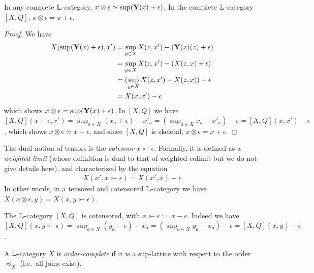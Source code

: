 \begin{lemma}
In any complete $\mathbb{L}$-category, $x\otimes \epsilon \simeq \sup(  \mathbf{Y}(x)+\epsilon  )$.
In the complete $\mathbb{L}$-category $[X,Q]$, $x\otimes \epsilon= x+\epsilon$.
\end{lemma}
\begin{proof}
We have 
\begin{align*}
X(\sup(\mathbf{Y}(x)+\epsilon), x')& =\sup_{y\in X}X(z,x')- (\mathbf{Y}(x)(z)+\epsilon)\\
&= \sup_{y\in X}X(z,x')-(X(z,x)+\epsilon)\\
&= (\sup_{y\in X}X(z,x')-X(z,x))-\epsilon\\
&= X(x,x')-\epsilon
\end{align*}
which shows $x\otimes \epsilon=\sup(\mathbf{Y}(x)+\epsilon)$. In $[X,Q]$ we have 
$[X,Q](x+\epsilon, x')=\sup_{a\in X}(x_{a}+\epsilon)-x'_{a}= (\sup_{a\in X}x_{a}-x'_{a})-\epsilon= [X,Q](x, x')-\epsilon$, which shows $x\otimes \epsilon \simeq x+\epsilon$, and since $[X,Q]$ is skeletal, $x\otimes \epsilon=x+\epsilon$.
\end{proof}


The dual notion of tensors is the \emph{cotensor} $x\multimapinv \epsilon$. Formally, it is defined as a \emph{weighted limit} (whose definition is dual to that of weighted colimit but we do not give details here), and characterized by the equation
\begin{align*}
X(x', x\multimapinv \epsilon)= X(x',x)-\epsilon
\end{align*}
In other words, in a tensored and cotensored $\mathbb{L}$-category we have $X(x\otimes \epsilon,y)= X(x,y\multimapinv \epsilon)$. 

\begin{example}
The $\mathbb{L}$-category $[X,Q]$ is cotensored, with $x\multimapinv \epsilon:= x-\epsilon$. Indeed we have $[X,Q](x,  y\multimapinv \epsilon)=\sup_{a\in X}( y_{a}-\epsilon)-x_{a}=(\sup_{a\in X} y_{a}-x_{a})-\epsilon= [X,Q](x,  y)-\epsilon$.
\end{example}

\begin{definition}
A $\mathbb{L}$-category $X$ is \emph{order-complete} if it is a sup-lattice with respect to the order $\preceq_{X}$ (i.e.~all joins exist).
\end{definition}


